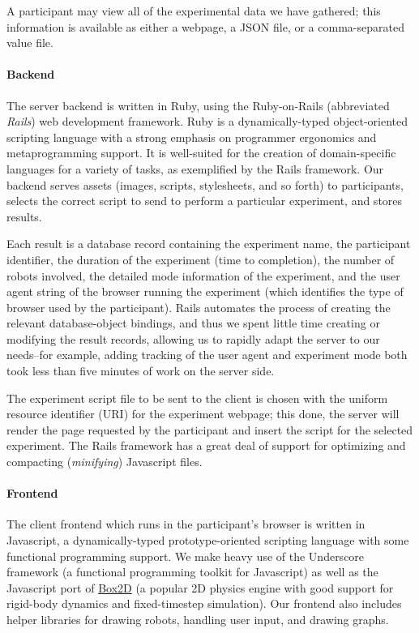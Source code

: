 A participant may view all of the experimental data we have gathered; this information is available as either a webpage, a JSON file, or a comma-separated value file.

\paragraph{Backend}

The server backend is written in Ruby, using the Ruby-on-Rails (abbreviated \emph{Rails}) web development framework. Ruby is a dynamically-typed object-oriented scripting language with a strong emphasis on programmer ergonomics and metaprogramming support. It is well-suited for the creation of domain-specific languages for a variety of tasks, as exemplified by the Rails framework. Our backend serves assets (images, scripts, stylesheets, and so forth) to participants, selects the correct script to send to perform a particular experiment, and stores results.

Each result is a database record containing the experiment name, the participant identifier, the duration of the experiment (time to completion), the number of robots involved, the detailed mode information of the experiment, and the user agent string of the browser running the experiment (which identifies the type of browser used by the participant). Rails automates the process of creating the relevant database-object bindings, and thus we spent little time creating or modifying the result records, allowing us to rapidly adapt the server to our needs--for example, adding tracking of the user agent and experiment mode both took less than five minutes of work on the server side.

The experiment script file to be sent to the client is chosen with the uniform resource identifier (URI) for the experiment webpage; this done, the server will render the page requested by the participant and insert the script for the selected experiment. The Rails framework has a great deal of support for optimizing and compacting (\emph{minifying}) Javascript files.

\paragraph{Frontend}

The client frontend which runs in the participant's browser is written in Javascript, a dynamically-typed prototype-oriented scripting language with some functional programming support. We make heavy use of the Underscore framework (a functional programming toolkit for Javascript) as well as the Javascript port of \href{http://box2d.org/}{Box2D} (a popular 2D physics engine with good support for rigid-body dynamics and fixed-timestep simulation). Our frontend also includes helper libraries for drawing robots, handling user input, and drawing graphs.


